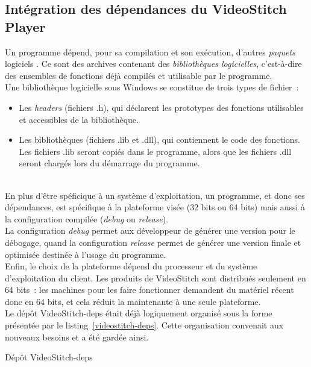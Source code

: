 \subsection{Intégration des dépendances du VideoStitch Player}
\label{integration-dependances-player}
Un programme dépend, pour sa compilation et son exécution, d'autres \emph{paquets} logiciels
\cite{dependance-logicielle}. Ce sont des archives contenant des \emph{bibliothèques logicielles},
c'est-à-dire des ensembles de fonctions déjà compilés et utilisable par le programme.\\
Une bibliothèque logicielle sous Windows se constitue de trois types de fichier\cite{bibliotheque-logicielle}~:
\begin{itemize}
  \item Les \textit{headers} (fichiers .h), qui déclarent les prototypes des fonctions utilisables
  et accessibles de la bibliothèque.
  \item Les bibliothèques (fichiers .lib et .dll), qui contiennent le code des fonctions.
  Les fichiers .lib seront copiés dans le programme, alors que les fichiers .dll seront
  chargés lors du démarrage du programme\cite{bibliotheque-logicielle}.
\end{itemize}
\ \\
En plus d'être spéficique à un système d'exploitation, un programme, et donc
ses dépendances, est spécifique à la plateforme visée (32 bits ou 64 bits)\cite{64-bit-computing}
mais aussi à la configuration compilée (\textit{debug} ou \textit{release})\cite{msdn-debug-release}.\\
La configuration \textit{debug} permet aux développeur de générer une version pour le débogage,
quand la configuration \textit{release} permet de générer une version finale et optimisée destinée
à l'usage du programme. \\
Enfin, le choix de la plateforme dépend du processeur et du
système d'exploitation du client. Les produits de VideoStitch sont distribués
seulement en 64 bits~: les machines pour les faire fonctionner demandent du matériel
récent donc en 64 bits, et cela réduit la maintenante à une seule plateforme.\\
\newline
Le dépôt VideoStitch-deps était déjà logiquement organisé sous la forme présentée par le listing~\ref{videostitch-deps}.
Cette organisation convenait aux nouveaux besoins et a été gardée ainsi. 
\begin{listing}
  \caption{Dépôt VideoStitch-deps}
  \label{videostitch-deps}
\end{listing}
